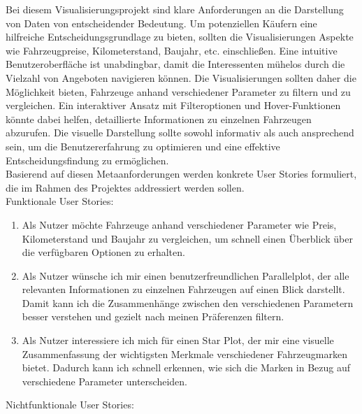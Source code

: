 Bei diesem Visualisierungsprojekt sind klare Anforderungen an die Darstellung von Daten von entscheidender Bedeutung. Um potenziellen Käufern eine hilfreiche Entscheidungsgrundlage zu bieten, sollten die Visualisierungen Aspekte wie Fahrzeugpreise, Kilometerstand, Baujahr, etc. einschließen. Eine intuitive Benutzeroberfläche ist unabdingbar, damit die Interessenten mühelos durch die Vielzahl von Angeboten navigieren können. Die Visualisierungen sollten daher die Möglichkeit bieten, Fahrzeuge anhand verschiedener Parameter zu filtern und zu vergleichen. Ein interaktiver Ansatz mit Filteroptionen und Hover-Funktionen könnte dabei helfen, detaillierte Informationen zu einzelnen Fahrzeugen abzurufen. Die visuelle Darstellung sollte sowohl informativ als auch ansprechend sein, um die Benutzererfahrung zu optimieren und eine effektive Entscheidungsfindung zu ermöglichen.  \\
Basierend auf diesen Metaanforderungen werden konkrete User Stories formuliert, die im Rahmen des Projektes addressiert werden sollen. \\
Funktionale User Stories: \\
\begin{enumerate}

    \item Als Nutzer möchte  Fahrzeuge anhand verschiedener Parameter wie Preis, Kilometerstand und Baujahr zu vergleichen, um schnell einen Überblick über die verfügbaren Optionen zu erhalten.
    
    \item Als Nutzer wünsche ich mir einen benutzerfreundlichen Parallelplot, der alle relevanten Informationen zu einzelnen Fahrzeugen auf einen Blick darstellt. Damit kann ich die Zusammenhänge zwischen den verschiedenen Parametern besser verstehen und gezielt nach meinen Präferenzen filtern.
    
    \item Als Nutzer interessiere ich mich für einen Star Plot, der mir eine visuelle Zusammenfassung der wichtigsten Merkmale verschiedener Fahrzeugmarken bietet. Dadurch kann ich schnell erkennen, wie sich die Marken in Bezug auf verschiedene Parameter unterscheiden.
\end{enumerate}
Nichtfunktionale User Stories: \\
